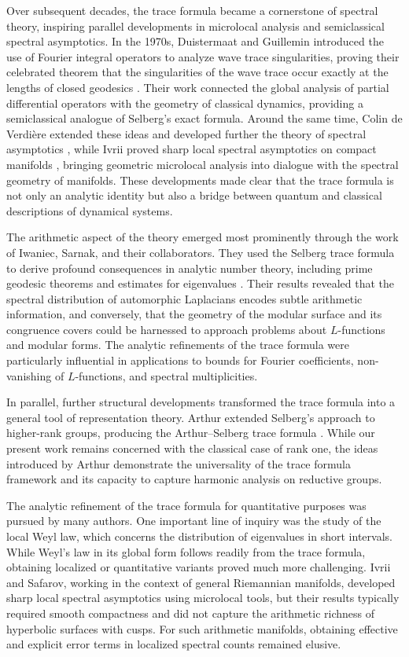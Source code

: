 Over subsequent decades, the trace formula became a cornerstone of spectral
theory, inspiring parallel developments in microlocal analysis and semiclassical
spectral asymptotics. In the 1970s, Duistermaat and Guillemin introduced the
use of Fourier integral operators to analyze wave trace singularities, proving
their celebrated theorem that the singularities of the wave trace occur exactly
at the lengths of closed geodesics \cite{DG1975}. Their work connected the
global analysis of partial differential operators with the geometry of
classical dynamics, providing a semiclassical analogue of Selberg’s exact
formula. Around the same time, Colin de Verdière extended these ideas and
developed further the theory of spectral asymptotics
\cite{Colin1978}, while Ivrii proved sharp local spectral asymptotics on
compact manifolds \cite{Ivrii1980}, bringing geometric microlocal analysis into
dialogue with the spectral geometry of manifolds. These developments made clear
that the trace formula is not only an analytic identity but also a bridge
between quantum and classical descriptions of dynamical systems.

The arithmetic aspect of the theory emerged most prominently through the work
of Iwaniec, Sarnak, and their collaborators. They used the Selberg trace
formula to derive profound consequences in analytic number theory, including
prime geodesic theorems and estimates for eigenvalues
\cite{Iwaniec2002,LuoSarnak1995}. Their results revealed that the spectral
distribution of automorphic Laplacians encodes subtle arithmetic information,
and conversely, that the geometry of the modular surface and its congruence
covers could be harnessed to approach problems about $L$-functions and modular
forms. The analytic refinements of the trace formula were particularly
influential in applications to bounds for Fourier coefficients, non-vanishing
of $L$-functions, and spectral multiplicities.

In parallel, further structural developments transformed the trace formula into
a general tool of representation theory. Arthur extended Selberg’s approach to
higher-rank groups, producing the Arthur–Selberg trace formula
\cite{ArthurBook}. While our present work remains concerned with the classical
case of rank one, the ideas introduced by Arthur demonstrate the universality
of the trace formula framework and its capacity to capture harmonic analysis on
reductive groups.

The analytic refinement of the trace formula for quantitative purposes was
pursued by many authors. One important line of inquiry was the study of the
local Weyl law, which concerns the distribution of eigenvalues in short
intervals. While Weyl’s law in its global form follows readily from the trace
formula, obtaining localized or quantitative variants proved much more
challenging. Ivrii and Safarov, working in the context of general Riemannian
manifolds, developed sharp local spectral asymptotics using microlocal tools,
but their results typically required smooth compactness and did not capture the
arithmetic richness of hyperbolic surfaces with cusps. For such arithmetic
manifolds, obtaining effective and explicit error terms in localized spectral
counts remained elusive.

